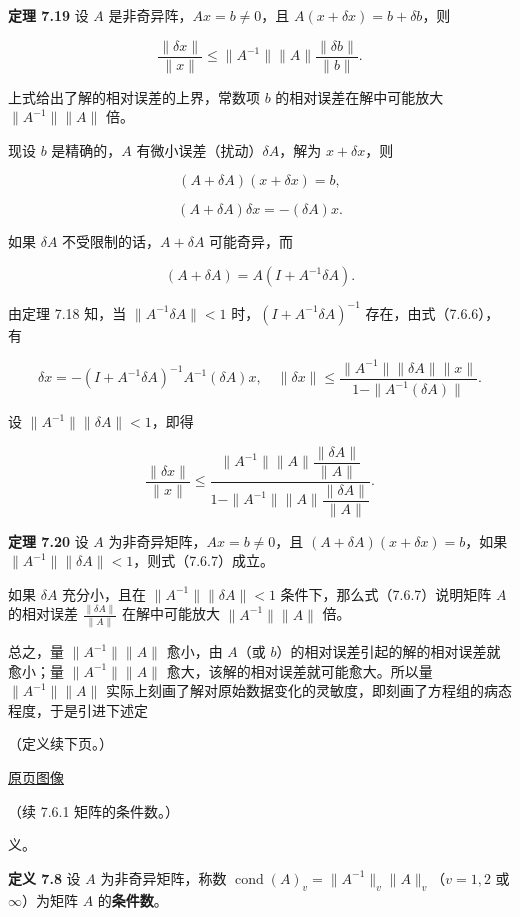 \documentclass[
  10pt,
  fontset=fandol]{ctexart}
\begin{document}
\textbf{定理 7.19} 设 \(A\) 是非奇异阵，\(Ax=b\neq0\)，且 \(A(x+\delta x)=b+\delta b\)，则

\[
\frac{\|\delta x\|}{\|x\|}\leqslant\|A^{-1}\|\|A\|\frac{\|\delta b\|}{\|b\|}.
\]

上式给出了解的相对误差的上界，常数项 \(b\) 的相对误差在解中可能放大 \(\|A^{-1}\|\|A\|\) 倍。

现设 \(b\) 是精确的，\(A\) 有微小误差（扰动）\(\delta A\)，解为 \(x+\delta x\)，则

\[
(A+\delta A)(x+\delta x)=b,
\]

\[
(A+\delta A)\delta x=-(\delta A)x.
\tag{7.6.6}
\]

如果 \(\delta A\) 不受限制的话，\(A+\delta A\) 可能奇异，而

\[
(A+\delta A)=A(I+A^{-1}\delta A).
\]

由定理 7.18 知，当 \(\|A^{-1}\delta A\|<1\) 时，\((I+A^{-1}\delta A)^{-1}\) 存在，由式（7.6.6），有

\[
\delta x=-(I+A^{-1}\delta A)^{-1}A^{-1}(\delta A)x,\quad
\|\delta x\|\leqslant\frac{\|A^{-1}\|\|\delta A\|\|x\|}{1-\|A^{-1}(\delta A)\|}.
\]

设 \(\|A^{-1}\|\|\delta A\|<1\)，即得

\[
\frac{\|\delta x\|}{\|x\|}
\leqslant
\frac{\|A^{-1}\|\|A\|\dfrac{\|\delta A\|}{\|A\|}}
{1-\|A^{-1}\|\|A\|\dfrac{\|\delta A\|}{\|A\|}}.
\tag{7.6.7}
\]

\textbf{定理 7.20} 设 \(A\) 为非奇异矩阵，\(Ax=b\neq0\)，且 \((A+\delta A)(x+\delta x)=b\)，如果 \(\|A^{-1}\|\|\delta A\|<1\)，则式（7.6.7）成立。

如果 \(\delta A\) 充分小，且在 \(\|A^{-1}\|\|\delta A\|<1\) 条件下，那么式（7.6.7）说明矩阵 \(A\) 的相对误差 \(\frac{\|\delta A\|}{\|A\|}\) 在解中可能放大 \(\|A^{-1}\|\|A\|\) 倍。

总之，量 \(\|A^{-1}\|\|A\|\) 愈小，由 \(A\)（或 \(b\)）的相对误差引起的解的相对误差就愈小；量 \(\|A^{-1}\|\|A\|\) 愈大，该解的相对误差就可能愈大。所以量 \(\|A^{-1}\|\|A\|\) 实际上刻画了解对原始数据变化的灵敏度，即刻画了方程组的病态程度，于是引进下述定

（定义续下页。）

\href{../../source-images/pdf-207.jpeg}{原页图像}

（续 7.6.1 矩阵的条件数。）

义。

\textbf{定义 7.8} 设 \(A\) 为非奇异矩阵，称数 \(\operatorname{cond}(A)_v=\|A^{-1}\|_v\|A\|_v\)（\(v=1,2\) 或 \(\infty\)）为矩阵 \(A\) 的\textbf{条件数}。
\end{document}
